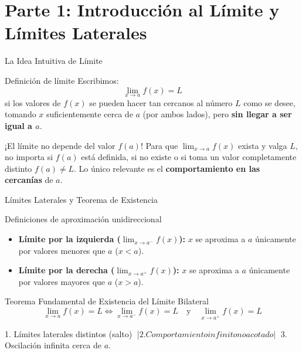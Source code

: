 \documentclass[aspectratio=169]{beamer}
\begin{document}
\begin{frame}[plain]
  \titlepage
\end{frame}

\section{Parte 1: Introducción al Límite y Límites Laterales}


\begin{frame}{La Idea Intuitiva de Límite}
  \begin{block}{Definición de límite}
    Escribimos:
    $$\lim_{x \to a} f(x) = L$$
    si los valores de $f(x)$ se pueden hacer tan cercanos al número $L$ como se desee, tomando $x$ suficientemente cerca de $a$ (por ambos lados), pero \textbf{sin llegar a ser igual a $a$}.
  \end{block}

  \vspace{4pt}
  \begin{alertblock}{¡El límite no depende del valor $f(a)$!}
    Para que $\lim_{x \to a} f(x)$ exista y valga $L$, no importa si $f(a)$ está definida, si no existe o si toma un valor completamente distinto $f(a) \neq L$. Lo único relevante es el \textbf{comportamiento en las cercanías} de $a$.
  \end{alertblock}
\end{frame}

\begin{frame}{Límites Laterales y Teorema de Existencia}
  \begin{block}{Definiciones de aproximación unidireccional}
    \begin{itemize}
      \item \textbf{Límite por la izquierda ($\lim_{x \to a^-} f(x)$):} $x$ se aproxima a $a$ únicamente por valores menores que $a$ ($x < a$).
      \item \textbf{Límite por la derecha ($\lim_{x \to a^+} f(x)$):} $x$ se aproxima a $a$ únicamente por valores mayores que $a$ ($x > a$).
    \end{itemize}
  \end{block}

  \vspace{4pt}
  \begin{block}{Teorema Fundamental de Existencia del Límite Bilateral}
    $$\boxed{\lim_{x \to a} f(x) = L \iff \lim_{x \to a^-} f(x) = L \quad\text{y}\quad \lim_{x \to a^+} f(x) = L}$$
  \end{block}

  \vspace{4pt}
  \begin{mwextra}
    1. Límites laterales distintos (salto) $\;$|\;$ 2. Comportamiento infinito no acotado $\;$|\;$ 3. Oscilación infinita cerca de $a$.
  \end{mwextra}
\end{frame}
\end{document}
